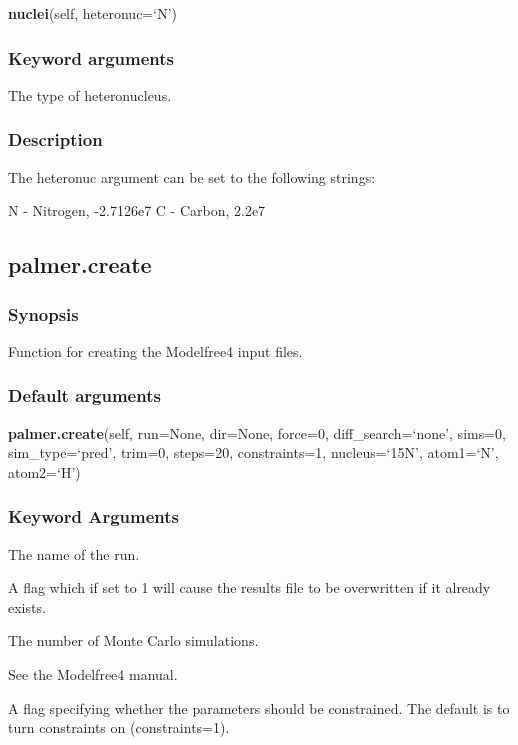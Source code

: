 \textsf{\textbf{nuclei}(self, heteronuc=`N')}


\subsubsection{Keyword arguments}

  The type of heteronucleus.

\subsubsection{Description}

The heteronuc argument can be set to the following strings:

    N - Nitrogen, -2.7126e7
    C - Carbon, 2.2e7


\newpage

\subsection{palmer.create}


\subsubsection{Synopsis}

Function for creating the Modelfree4 input files.

\subsubsection{Default arguments}

\textsf{\textbf{palmer.create}(self, run=None, dir=None, force=0, diff\_search=`none', sims=0, sim\_type=`pred', trim=0, steps=20, constraints=1, nucleus=`15N', atom1=`N', atom2=`H')}


\subsubsection{Keyword Arguments}

  The name of the run.

  A flag which if set to 1 will cause the results file to be overwritten if it already exists.

  The number of Monte Carlo simulations.

  See the Modelfree4 manual.

  A flag specifying whether the parameters should be constrained.  The default is to turn constraints on (constraints=1).

